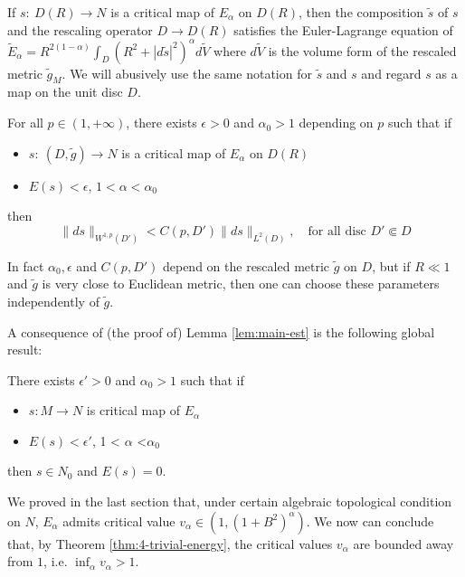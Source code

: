 If \(s:\ D(R) \longrightarrow N\) is a critical map
of \(E_\alpha\) on \(D(R)\), then the composition \(\tilde s\) of \(s\) and the rescaling operator \(D
\longrightarrow D(R)\) satisfies the Euler-Lagrange equation of \(\tilde E_\alpha =
R^{2(1-\alpha)}\int_D (R^2 + |d\tilde s|^2)^\alpha d\tilde V\) where \(d\tilde V\) is
the volume form of the rescaled metric \(\tilde g_M\). We will abusively
use the same notation for \(\tilde s\) and \(s\) and regard \(s\) as a map on the unit disc \(D\). 

\begin{lemma}
\label{lem:main-est}
For all \(p\in (1,+\infty)\), there exists \(\epsilon>0\) and \(\alpha_0 >1\)
depending on \(p\) such that if
\begin{itemize}
\item \(s:\ (D,\tilde g) \longrightarrow N\) is a critical map of \(E_\alpha\) on \(D(R)\)
\item \(E(s) < \epsilon\), \(1 < \alpha <\alpha_0\)
\end{itemize}
then
\[
 \|ds\|_{W^{1,p}(D')} < C(p,D') \|ds\|_{L^2(D)},\quad \text{for all disc }  D'\Subset D 
\]
\end{lemma}

\begin{remark}
In fact \(\alpha_0, \epsilon\) and \(C(p,D')\) depend on the rescaled metric \(\tilde
g\) on \(D\), but if \(R \ll 1\) and \(\tilde g\) is very close to Euclidean metric,
then one can choose these parameters independently of \(\tilde g\). 
\end{remark}

A consequence of (the proof of) Lemma \ref{lem:main-est} is the following global result:

\begin{theorem}
\label{thm:4-trivial-energy}
There exists \(\epsilon' >0\) and \(\alpha_0 > 1\)  such that if
\begin{itemize}
\item \(s: M \longrightarrow N\) is critical map of \(E_\alpha\)
\item \(E(s)<\epsilon'\), 1 < \(\alpha\) <\(\alpha_{\text{0}}\)
\end{itemize}
then \(s\in N_0\) and \(E(s) = 0\).
\end{theorem}

We proved in the last section that, under certain algebraic topological condition on \(N\), \(E_\alpha\) admits critical value \(v_\alpha \in (1, (1+B^2)^\alpha)\). We now
can conclude that, by Theorem \ref{thm:4-trivial-energy}, the critical values \(v_\alpha\)
are bounded away from \(1\), i.e. \(\inf_{\alpha} v_\alpha > 1\).


